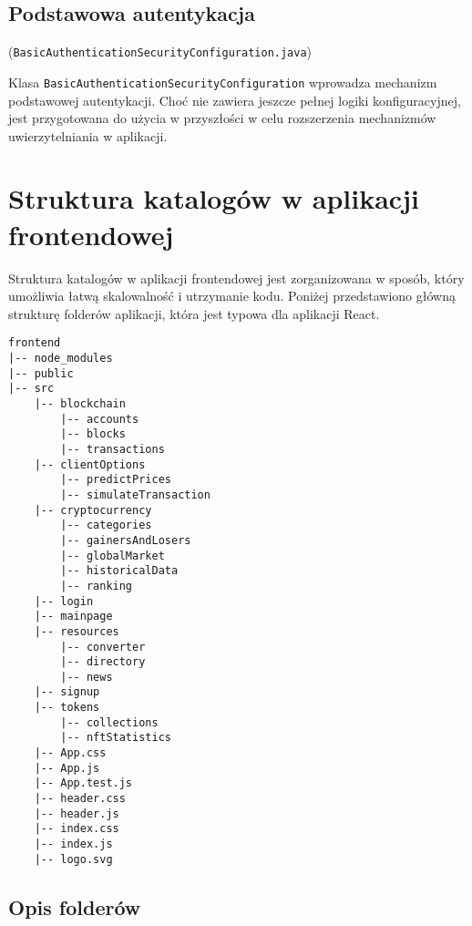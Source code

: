 \subsection{Podstawowa autentykacja} (\texttt{BasicAuthenticationSecurityConfiguration.java})

Klasa \texttt{BasicAuthenticationSecurityConfiguration} wprowadza mechanizm podstawowej autentykacji. Choć nie zawiera jeszcze pełnej logiki konfiguracyjnej, jest przygotowana do użycia w przyszłości w celu rozszerzenia mechanizmów uwierzytelniania w aplikacji.	
	
\section{Struktura katalogów w aplikacji frontendowej}

Struktura katalogów w aplikacji frontendowej jest zorganizowana w sposób, który umożliwia łatwą skalowalność i utrzymanie kodu. Poniżej przedstawiono główną strukturę folderów aplikacji, która jest typowa dla aplikacji React.
{\footnotesize
\begin{verbatim}
frontend
|-- node_modules
|-- public
|-- src
    |-- blockchain
        |-- accounts
        |-- blocks
        |-- transactions
    |-- clientOptions
        |-- predictPrices
        |-- simulateTransaction
    |-- cryptocurrency
        |-- categories
        |-- gainersAndLosers
        |-- globalMarket
        |-- historicalData
        |-- ranking
    |-- login
    |-- mainpage
    |-- resources
        |-- converter
        |-- directory
        |-- news
    |-- signup
    |-- tokens
        |-- collections
        |-- nftStatistics
    |-- App.css
    |-- App.js
    |-- App.test.js
    |-- header.css
    |-- header.js
    |-- index.css
    |-- index.js
    |-- logo.svg
\end{verbatim}
}

\subsection{Opis folderów}

